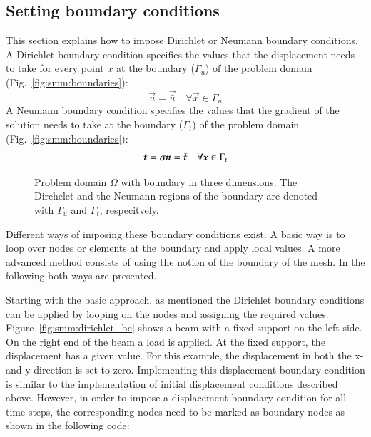 \subsection{Setting boundary conditions\label{sect:smm:boundary}} This
section explains how to impose Dirichlet or Neumann boundary
conditions. A Dirichlet boundary condition specifies the values that
the displacement needs to take for every point $x$ at the boundary
($\Gamma_u$) of the problem domain (Fig.~\ref{fig:smm:boundaries}):
\begin{equation} 
  \vec{u} = \vec{\bar u} \quad \forall \vec{x}\in
  \Gamma_{u}
\end{equation} 
A Neumann boundary condition specifies the values that
the gradient of the solution needs to take at the boundary
($\Gamma_t$) of the problem domain (Fig.~\ref{fig:smm:boundaries}):
\begin{equation} 
  \boldsymbol{t} = \boldsymbol{\sigma} \boldsymbol{n} = \boldsymbol{\bar t} \quad
  \forall \boldsymbol{x}\in \Gamma_{t}
\end{equation}
\begin{figure} \centering
\def\svgwidth{0.5\columnwidth}
  
  \caption{Problem domain $\Omega$ with boundary in three dimensions. The Dirchelet and the Neumann regions of the boundary are denoted with $\Gamma_u$ and $\Gamma_t$, respecitvely.\label{fig:smm:boundaries}}
  \label{fig:problemDomain}
\end{figure}

Different ways of imposing these boundary conditions exist. A basic
way is to loop over nodes or elements at the boundary and apply local
values. A more advanced method consists of using the notion of the
boundary of the mesh. In the following both ways are presented.

Starting with the basic approach, as mentioned the Dirichlet boundary
conditions can be applied by looping on the nodes and assigning the
required values. Figure~\ref{fig:smm:dirichlet_bc} shows a beam with a
fixed support on the left side. On the right end of the beam a load is
applied. At the fixed support, the displacement has a given value. For
this example, the displacement in both the x- and y-direction is set
to zero. Implementing this displacement boundary condition is similar
to the implementation of initial displacement conditions described
above. However, in order to impose a displacement boundary condition
for all time steps, the corresponding nodes need to be marked as
boundary nodes as shown in the following code:

